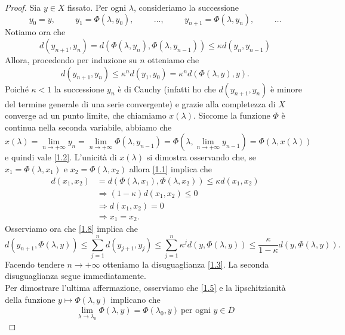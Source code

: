 \begin{proof}
Sia $y \in X$ fissato. Per ogni $\lambda$, consideriamo la successione
$$
y_{0}=y, \hspace{1cm} y_{1}=\Phi(\lambda, y_{0}), \hspace{1cm} \ldots, \hspace{1cm} y_{n+1}=\Phi(\lambda, y_{n}), \hspace{1cm} \ldots 
$$
Notiamo ora che
$$
d(y_{n+1},y_{n})=d(\Phi(\lambda,y_{n}), \Phi(\lambda,y_{n-1}))\leq\kappa d(y_{n},y_{n-1})
$$
Allora, procedendo per induzione su $n$ otteniamo che
\begin{equation}\label{1.8}
    d(y_{n+1},y_{n})\leq\kappa^{n} d(y_{1},y_{0}) = \kappa^{n} d(\Phi(\lambda,y), y).
\end{equation}
Poiché $\kappa <1$ la successione $y_{n}$ è di Cauchy (infatti ho che $d(y_{n+1},y_{n})$ è minore del termine generale di una serie convergente) e grazie alla completezza di $X$ converge ad un punto limite, che chiamiamo $x(\lambda)$. Siccome la funzione $\Phi$ è continua nella seconda variabile, abbiamo che
$$
x(\lambda)
=\lim_{n\rightarrow +\infty}y_{n}
=\lim_{n\rightarrow +\infty}\Phi(\lambda,y_{n-1})
=\Phi(\lambda,\lim_{n\rightarrow +\infty}y_{n-1})
=\Phi(\lambda,x(\lambda))$$
e quindi vale \eqref{1.2}. L'unicità di $x(\lambda)$ si dimostra osservando che, se $x_{1}=\Phi(\lambda,x_{1})$ e $x_{2}=\Phi(\lambda,x_{2})$ allora \eqref{1.1} implica che
\begin{align*}
d(x_{1}, x_{2})&=d(\Phi(\lambda,x_{1}), \Phi(\lambda,x_{2})) \leq \kappa d(x_{1}, x_{2}) \\
&\Longrightarrow (1-\kappa)d(x_{1}, x_{2})\leq 0 \\
&\Longrightarrow d(x_{1}, x_{2}) = 0 \\
&\Longrightarrow x_{1}=x_{2}.
\end{align*}
Osserviamo ora che \eqref{1.8} implica che
$$
d(y_{n+1}, \Phi(\lambda,y)) 
\leq \sum_{j=1}^{n} d(y_{j+1}, y_{j}) 
\leq \sum_{j=1}^{n}\kappa^{j} d(y, \Phi(\lambda,y))
\leq \frac{\kappa}{1-\kappa} d(y, \Phi(\lambda,y)).
$$
Facendo tendere $n\rightarrow +\infty$ otteniamo la disuguaglianza \eqref{1.3}. La seconda disuguaglianza segue immediatamente.\\
Per dimostrare l'ultima affermazione, osserviamo che \eqref{1.5} e la lipschitzianità della funzione $y \mapsto \Phi(\lambda,y)$ implicano che
\begin{equation}\label{1.9}
\lim_{\lambda \rightarrow \lambda_{0}}\Phi(\lambda,y)=\Phi(\lambda_{0},y) \ \text{per ogni $y\in\overline{D}$}

\end{equation}
\end{proof}
